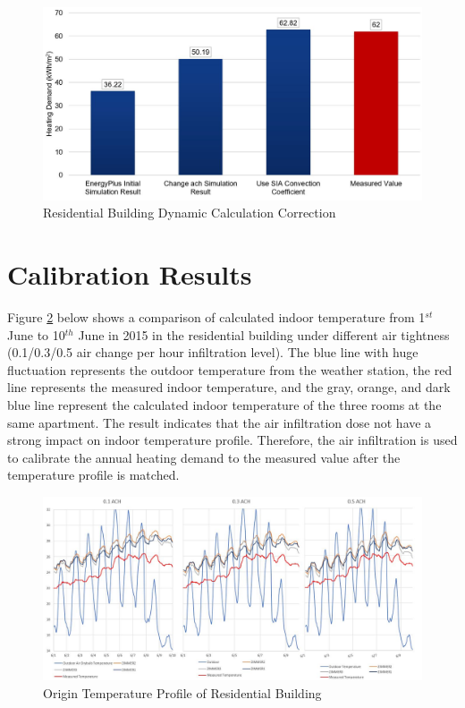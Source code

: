 \documentclass[a4paper, oneside]{discothesis}
\begin{document}
		\begin{figure}[htbp]
		\centering
		\includegraphics[scale=0.4]{Residential_EP.jpg}
		\caption{Residential Building Dynamic Calculation Correction}
		\label{fig:Hongger_EP}
		\end{figure}
		
		




	\section{Calibration Results}

			Figure \ref{fig:ACH_Compare} below shows a comparison of calculated indoor temperature from 1$^{st}$ June to 10$^{th}$ June in 2015 in the residential building under different air tightness (0.1/0.3/0.5 air change per hour infiltration level). The blue line with huge fluctuation represents the outdoor temperature from the weather station, the red line represents the measured indoor temperature, and the gray, orange, and dark blue line represent the calculated indoor temperature of the three rooms at the same apartment. The result indicates that the air infiltration dose not have a strong impact on indoor temperature profile. Therefore, the air infiltration is used to calibrate the annual heating demand to the measured value after the temperature profile is matched.\\
		
			\begin{figure}[H]
			\centering
			\includegraphics[scale=0.4]{ACH_Compare.JPG}
			\caption{Origin Temperature Profile of Residential Building}
			\label{fig:ACH_Compare}
			\end{figure}
\end{document}
